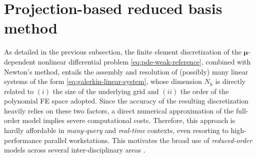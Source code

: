 \documentclass{elsarticle}
\numberwithin{equation}{section}
\theoremstyle{theorem}
\theoremstyle{definition}
\theoremstyle{remark}
\theoremstyle{proposition}
\numberwithin{figure}{section}
\newcommand{\bg}[1]{\boldsymbol{#1}}
\begin{document}
		
	
	\section{Projection-based reduced basis method}
	\label{section:Projection-based reduced basis method}
	
		As detailed in the previous subsection, the finite element discretization of the $\bg{\mu}$-dependent nonlinear differential problem \eqref{eq:pde-weak-reference}, combined with Newton's method, entails the assembly and resolution of (possibly) many linear systems of the form \eqref{eq:galerkin-linear-system}, whose dimension $N_h$ is directly related to $(i)$ the size of the underlying grid and $(ii)$ the order of the polynomial FE space adopted. Since the accuracy of the resulting discretization heavily relies on these two factors, a direct numerical approximation of the full-order model implies severe computational costs. Therefore, this approach is hardly affordable in \emph{many-query} and \emph{real-time} contexts, even resorting to high-performance parallel workstations. %
		This motivates the broad use of \emph{reduced-order} models across several inter-disciplinary areas \cite{HSR16, QMN15}. %
						
\end{document}
